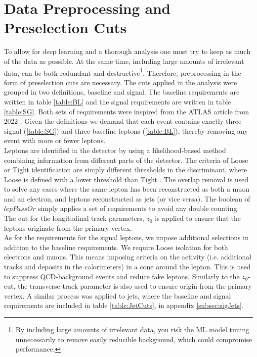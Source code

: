 \section{Data Preprocessing and Preselection Cuts}\label{subsec:Cuts}
To allow for deep learning and a thorough analysis one must try to keep
as much of the data as possible. At the same time, including large amounts
of irrelevant data, can be both redundant and destructive\footnote{By including 
large amounts of irrelevant data, you risk the \ac{ML} model tuning unnecessarily 
to remove easily reducible background, which could compromise performance.}. 
Therefore, preprocessing in the form of preselection cuts are necessary. 
The cuts applied in the analysis were grouped in two definitions, baseline and signal. 
The baseline requirements are written in table \ref{table:BL} and the signal requirements are written 
in table \ref{table:SG}. Both sets of requirements were inspired from the \ac{ATLAS} article from 2022 \cite{franchini_search_2019}.
Given the definitions we demand that each event contains exactly three signal (\ref{table:SG}) and 
three baseline leptons (\ref{table:BL}), thereby removing any event with more or fewer leptons. 
\\
Leptons are identified in the detector by using a likelihood-based method combining
information from different parts of the detector. The criteria of Loose or Tight 
identification are simply different thresholds in the discriminant, where Loose is 
defined with a lower threshold than Tight \cite{Aaboud_2019}. The overlap removal is used to solve any cases
where the same lepton has been reconstructed as both a muon and an electron, and leptons reconstructed 
as jets (or vice versa). The boolean of $lepPassOr$ simply applies a set of requirements to avoid any double 
counting. The cut for the longitudinal track parameters, $z_0$ is applied to ensure that the leptons originate 
from the primary vertex.
\\
As for the requirements for the signal leptons, we impose additional selections in addition 
to the baseline requirements. We require Loose isolation for both electrons and muons. This means
imposing criteria on the activity (i.e. additional tracks and deposits in the calorimeters) in a cone around the lepton. 
This is used to suppress \ac{QCD}-background events and reduce fake leptons. Similarly to the $z_0$-cut, the transverse 
track parameter is also used to ensure origin from the primary vertex. A similar process was applied to jets, where the baseline 
and signal requirements are included in table \ref{table:JetCuts}, in appendix \ref{subsec:sigJets}.
